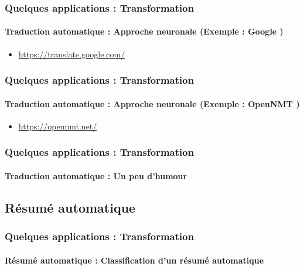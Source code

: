 \documentclass[xcolor=table]{beamer}
\begin{document}
\begin{frame}
	\frametitle{Quelques applications : Transformation}
	\framesubtitle{Traduction automatique : Approche neuronale (Exemple : Google \cite{16-wu-al} )}
	\begin{itemize}
		\item \url{https://translate.google.com/}
	\end{itemize}
	\begin{center}
	\end{center}
\end{frame}

\begin{frame}
	\frametitle{Quelques applications : Transformation}
	\framesubtitle{Traduction automatique : Approche neuronale (Exemple : OpenNMT \cite{17-klein-al})}
	\begin{itemize}
		\item \url{https://opennmt.net/}
	\end{itemize}
\end{frame}

\begin{frame}
	\frametitle{Quelques applications : Transformation}
	\framesubtitle{Traduction automatique : Un peu d'humour}
	
	\begin{center}
	\end{center}
	
\end{frame}

\subsection{Résumé automatique}

\begin{frame}
	\frametitle{Quelques applications : Transformation}
	\framesubtitle{Résumé automatique : Classification d'un résumé automatique}
\end{frame}
\end{document}
